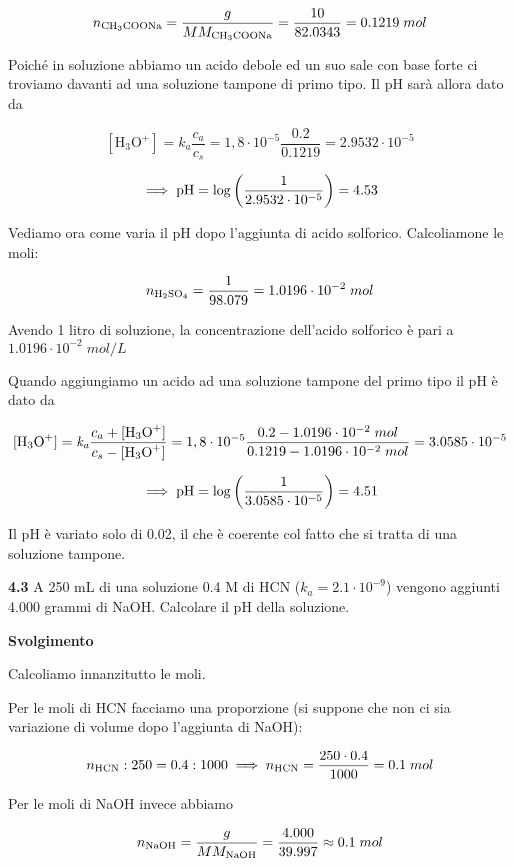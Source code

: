$$n_{\rm CH_3COONa}=\frac{g}{MM_{\rm CH_3COONa}}=\frac{10}{82.0343}=0.1219\;mol$$

Poiché in soluzione abbiamo un acido debole ed un suo sale con base forte ci troviamo davanti ad una soluzione tampone di primo tipo. Il pH sarà allora dato da

$$[\text{H}_3\text{O}^+]
=k_a \frac{c_a}{c_s}
=1,8 \cdot 10^{-5} \frac{0.2}{0.1219}
=2.9532 \cdot 10^{-5}$$

$$\implies \rm pH=\log{\left( \frac{1}{2.9532 \cdot 10^{-5}} \right)}=4.53$$

Vediamo ora come varia il pH dopo l'aggiunta di acido solforico. Calcoliamone le moli:

$$n_{\rm H_2SO_4}=\frac{1}{98.079}=1.0196 \cdot 10^{-2}\;mol$$

Avendo 1 litro di soluzione, la concentrazione dell'acido solforico è pari a $1.0196 \cdot 10^{-2}\;mol/L$

Quando aggiungiamo un acido ad una soluzione tampone del primo tipo il pH è dato da

$${[\text{H}_3\text{O}^+]}=\textit{k}_\textit{a} \frac{c_a + \rm{[\text{H}_3\text{O}^+]}}{c_s - \rm{[\text{H}_3\text{O}^+]}}
=1,8 \cdot 10^{-5} \frac{0.2 - 1.0196 \cdot 10^{-2}\;mol}{0.1219 - 1.0196 \cdot 10^{-2}\;mol}
=3.0585 \cdot 10^{-5}$$

$$\implies \rm pH=\log{\left( \frac{1}{3.0585 \cdot 10^{-5}} \right)}=4.51$$

Il pH è variato solo di 0.02, il che è coerente col fatto che si tratta di una soluzione tampone.

\vspace{0.2cm}\textbf{4.3} A 250 mL di una soluzione 0.4 M di HCN ($k_a = 2.1 \cdot 10^{-9}$) vengono aggiunti 4.000 grammi di NaOH. Calcolare il pH della soluzione.

\vspace{0.2cm}\large\textbf{Svolgimento}\normalsize

\vspace{0.2cm}Calcoliamo innanzitutto le moli.

Per le moli di HCN facciamo una proporzione (si suppone che non ci sia variazione di volume dopo l'aggiunta di NaOH):

$$n_{\rm HCN}:250=0.4:1000
\implies
n_{\rm HCN}=\frac{250 \cdot 0.4}{1000}=0.1\;mol$$

Per le moli di NaOH invece abbiamo

$$n_{\rm NaOH}=\frac{g}{MM_{\rm NaOH}}
=\frac{4.000}{39.997} \approx 0.1\;mol$$

